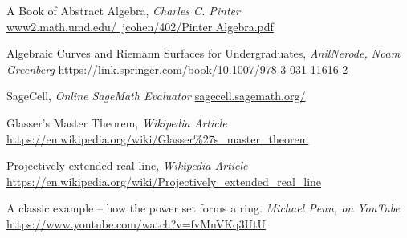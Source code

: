 \documentclass[12pt, oneside]{book}
\begin{document}
\begin{thebibliography}{9}
	
 A Book of Abstract Algebra, \textit{Charles C. Pinter}  \newline
\href{http://www2.math.umd.edu/~jcohen/402/Pinter%20Algebra.pdf}
     {www2.math.umd.edu/~jcohen/402/Pinter Algebra.pdf}

 Algebraic Curves and Riemann Surfaces for Undergraduates, 
\textit{AnilNerode, Noam Greenberg}  \newline
\href{https://link.springer.com/book/10.1007/978-3-031-11616-2}
     {https://link.springer.com/book/10.1007/978-3-031-11616-2}

 SageCell, \textit{Online SageMath Evaluator}  \newline
\href{https://sagecell.sagemath.org/}
     {sagecell.sagemath.org/}

 Glasser's Master Theorem, \textit{Wikipedia Article} \newline
\href{https://en.wikipedia.org/wiki/Glasser%27s_master_theorem}
     {https://en.wikipedia.org/wiki/Glasser\%27s\_master\_theorem}

 Projectively extended real line, \textit{Wikipedia Article} \newline
\href{https://en.wikipedia.org/wiki/Projectively_extended_real_line}
     {https://en.wikipedia.org/wiki/Projectively\_extended\_real\_line}

 A classic example -- how the power set forms a ring. 
\textit{Michael Penn, on YouTube}
\href{https://www.youtube.com/watch?v=fvMnVKq3UtU}
     {https://www.youtube.com/watch?v=fvMnVKq3UtU}

\end{thebibliography}

\end{document}
